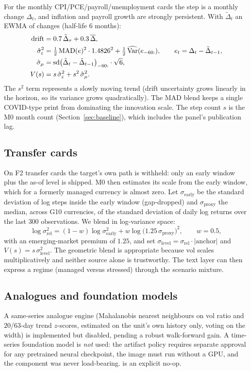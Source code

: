 For the monthly CPI/PCE/payroll/unemployment cards the step is a monthly change $\Delta_t$, and inflation and payroll growth are strongly
persistent. With $\tilde\Delta_t$ an EWMA of changes (half-life $6$ months):
\begin{align}
  \text{drift} &= 0.7\,\tilde\Delta_\tau + 0.3\,\overline{\Delta},\\
  \hat\sigma^2_\varepsilon &= \tfrac12\,\mathrm{MAD}(e)^2\cdot1.4826^2 + \tfrac12\,\widehat{\operatorname{Var}}(e_{-60:}),\qquad e_t=\Delta_t-\tilde\Delta_{t-1},\\
  \hat\sigma_\mu &= \operatorname{sd}\bigl(\tilde\Delta_{t}-\tilde\Delta_{t-1}\bigr)_{-60:}\cdot\sqrt6,\\
  V(s) &= s\,\hat\sigma^2_\varepsilon + s^2\,\hat\sigma^2_\mu .
\end{align}
The $s^2$ term represents a slowly moving trend (drift uncertainty grows linearly in the horizon, so its variance grows quadratically). The
MAD blend keeps a single COVID-type print from dominating the innovation scale. The step count $s$ is the M0 month count
(Section~\ref{sec:baseline}), which includes the panel's publication lag.

\subsection{Transfer cards}

On F2 transfer cards the target's own path is withheld: only an early window plus the as-of level is shipped. M0 then estimates its scale from the
early window, which for a formerly managed currency is almost zero. Let $\sigma_{\mathrm{early}}$ be the standard deviation of log steps inside the
early window (gap-dropped) and $\sigma_{\mathrm{proxy}}$ the median, across G10 currencies, of the standard deviation of daily log returns over the last
$300$ observations. We blend in log-variance space:
\begin{equation}
  \log\sigma^2_{\mathrm{rel}} = (1-w)\log\sigma^2_{\mathrm{early}} + w\log\bigl(1.25\,\sigma_{\mathrm{proxy}}\bigr)^2,\qquad w=0.5,
\end{equation}
with an emerging-market premium of $1.25$, and set $\sigma_{\mathrm{level}}=\sigma_{\mathrm{rel}}\cdot|\text{anchor}|$ and $V(s)=s\,\sigma^2_{\mathrm{level}}$.
The geometric blend is appropriate because vol scales multiplicatively and neither source alone is trustworthy. The text layer can then express a
regime (managed versus stressed) through the scenario mixture.

\subsection{Analogues and foundation models}

A same-series analogue engine (Mahalanobis nearest neighbours on vol ratio and $20$/$63$-day trend $z$-scores, estimated on the unit's own history
only, voting on the width) is implemented but disabled, pending a robust walk-forward gain. A time-series foundation model is \emph{not} used: the
artifact policy requires separate approval for any pretrained neural checkpoint, the image must run without a GPU, and the component was never
load-bearing.  is an explicit no-op.
